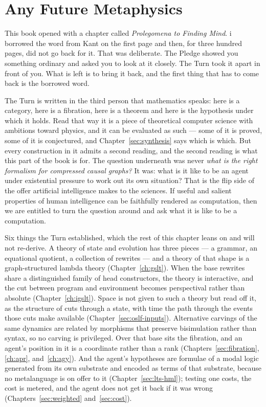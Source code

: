 \chapter{Any Future Metaphysics}
\label{ch:kant}

This book opened with a chapter called \emph{Prolegomena to Finding
Mind}.
i borrowed the word from Kant on the first page and then, for three
hundred pages, did not go back for it.
That was deliberate.
The Pledge showed you something ordinary and asked you to look at
it closely.
The Turn took it apart in front of you.
What is left is to bring it back, and the first thing that has to
come back is the borrowed word.

The Turn is written in the third person that mathematics speaks:
here is a category, here is a fibration, here is a theorem and here
is the hypothesis under which it holds.
Read that way it is a piece of theoretical computer science with
ambitions toward physics, and it can be evaluated as such --- some
of it is proved, some of it is conjectured, and Chapter~\ref{sec:synthesis}
says which is which.
But every construction in it admits a second reading, and the
second reading is what this part of the book is for.
The question underneath was never \emph{what is the right
formalism for compressed causal graphs?}
It was: what is it like to be an agent under existential pressure
to work out its own situation?
That is the flip side of the offer artificial intelligence makes
to the sciences.
If useful and salient properties of human intelligence can be
faithfully rendered as computation, then we are entitled to turn
the question around and ask what it is like to be a computation.

Six things the Turn established, which the rest of this chapter
leans on and will not re-derive.
A theory of state and evolution has three pieces --- a grammar, an
equational quotient, a collection of rewrites --- and a theory of
that shape is a graph-structured lambda theory
(Chapter~\ref{ch:gslt}).
When the base rewrites share a distinguished family of head
constructors, the theory is interactive, and the cut between
program and environment becomes perspectival rather than absolute
(Chapter~\ref{ch:igslt}).
Space is not given to such a theory but read off it, as the
structure of cuts through a state, with time the path through the
events those cuts make available (Chapter~\ref{sec:oslf-inputs}).
Alternative carvings of the same dynamics are related by morphisms
that preserve bisimulation rather than syntax, so no carving is
privileged.
Over that base sits the fibration, and an agent's position in it is
a coordinate rather than a rank
(Chapters~\ref{sec:fibration}, \ref{ch:apr}, and~\ref{ch:agy}).
And the agent's hypotheses are formulae of a modal logic generated
from its own substrate and encoded as terms of that substrate,
because no metalanguage is on offer to it
(Chapter~\ref{sec:lts-hml}); testing one costs, the cost is
metered, and the agent does not get it back if it was wrong
(Chapters~\ref{sec:weighted} and~\ref{sec:cost}).

